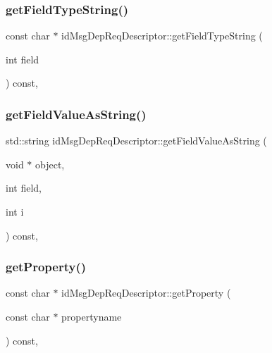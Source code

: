 \subsubsection{\texorpdfstring{get\+Field\+Type\+String()}{getFieldTypeString()}}
{\footnotesize\ttfamily const char $\ast$ id\+Msg\+Dep\+Req\+Descriptor\+::get\+Field\+Type\+String (\begin{DoxyParamCaption}\item[{int}]{field }\end{DoxyParamCaption}) const\hspace{0.3cm}{\ttfamily [override]}, {\ttfamily [virtual]}}

\mbox{\label{classidMsgDepReqDescriptor_a01154250296e827bb3b46ffd9356d403}} 
\subsubsection{\texorpdfstring{get\+Field\+Value\+As\+String()}{getFieldValueAsString()}}
{\footnotesize\ttfamily std\+::string id\+Msg\+Dep\+Req\+Descriptor\+::get\+Field\+Value\+As\+String (\begin{DoxyParamCaption}\item[{void $\ast$}]{object,  }\item[{int}]{field,  }\item[{int}]{i }\end{DoxyParamCaption}) const\hspace{0.3cm}{\ttfamily [override]}, {\ttfamily [virtual]}}

\mbox{\label{classidMsgDepReqDescriptor_a389f447ccbaba22709ec52b3ed5438f7}} 
\subsubsection{\texorpdfstring{get\+Property()}{getProperty()}}
{\footnotesize\ttfamily const char $\ast$ id\+Msg\+Dep\+Req\+Descriptor\+::get\+Property (\begin{DoxyParamCaption}\item[{const char $\ast$}]{propertyname }\end{DoxyParamCaption}) const\hspace{0.3cm}{\ttfamily [override]}, {\ttfamily [virtual]}}

